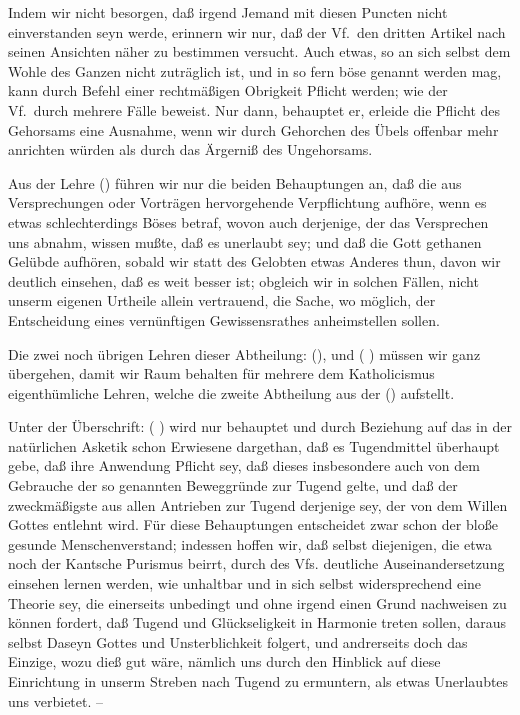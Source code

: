 Indem wir nicht besorgen, daß irgend Jemand mit diesen Puncten nicht einverstanden seyn werde, erinnern wir nur, daß der Vf.\ den dritten Artikel  nach seinen Ansichten näher zu bestimmen versucht. Auch etwas, so an sich selbst dem Wohle des Ganzen nicht zuträglich ist, und in so fern böse genannt werden mag, kann durch Befehl einer rechtmäßigen Obrigkeit Pflicht werden; wie der Vf.\ durch mehrere Fälle beweist. Nur dann, behauptet er, erleide die Pflicht des Gehorsams eine Ausnahme, wenn wir durch Gehorchen des Übels offenbar mehr anrichten würden als durch das Ärgerniß des Ungehorsams. \par
Aus der Lehre  () führen wir nur die beiden Behauptungen an, daß die aus Versprechungen oder Vorträgen hervorgehende Verpflichtung aufhöre, wenn es etwas schlechterdings Böses betraf, wovon auch derjenige, der das Versprechen uns abnahm, wissen mußte, daß es unerlaubt sey; und daß die Gott gethanen Gelübde aufhören, sobald wir statt des Gelobten etwas Anderes thun, davon wir deutlich einsehen, daß es weit besser ist; obgleich wir in solchen Fällen, nicht unserm eigenen Urtheile allein vertrauend, die Sache, wo möglich, der Entscheidung eines vernünftigen Gewissensrathes anheimstellen sollen. \par
Die zwei noch übrigen Lehren dieser Abtheilung:  (), und  ( ) müssen wir ganz übergehen, damit wir Raum behalten für mehrere dem Katholicismus eigenthümliche Lehren, welche die zweite Abtheilung aus der  () aufstellt. \par
Unter der Überschrift:  ( ) wird nur behauptet und durch Beziehung auf das in der natürlichen Asketik schon Erwiesene dargethan, daß es Tugendmittel überhaupt gebe, daß ihre Anwendung Pflicht sey, daß dieses insbesondere auch von dem Gebrauche der so genannten Beweggründe zur Tugend gelte, und daß der zweckmäßigste aus allen Antrieben zur Tugend derjenige sey, der von dem Willen Gottes entlehnt wird. Für diese Behauptungen entscheidet zwar schon der bloße gesunde Menschenverstand; indessen hoffen wir, daß selbst diejenigen, die etwa noch der Kantsche Purismus beirrt, durch des Vfs. deutliche Auseinandersetzung einsehen lernen werden, wie unhaltbar und in sich selbst widersprechend eine Theorie sey, die einerseits unbedingt und ohne irgend einen Grund nachweisen zu können fordert, daß Tugend und Glückseligkeit in Harmonie treten sollen, daraus selbst Daseyn Gottes und  Unsterblichkeit folgert, und andrerseits doch das Einzige, wozu dieß gut wäre, nämlich uns durch den Hinblick auf diese Einrichtung in unserm Streben nach Tugend zu ermuntern, als etwas Unerlaubtes uns verbietet. --\par
